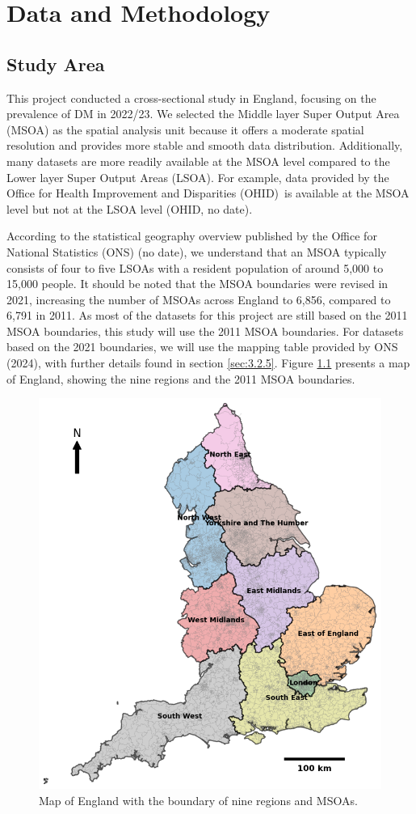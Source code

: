 \chapter{Data and Methodology}
\label{chap:3}
\section{Study Area}
\label{sec:3.1}
This project conducted a cross-sectional study in England, focusing on the prevalence of DM in 2022/23. We selected the Middle layer Super Output Area (MSOA) as the spatial analysis unit because it offers a moderate spatial resolution and provides more stable and smooth data distribution. Additionally, many datasets are more readily available at the MSOA level compared to the Lower layer Super Output Areas (LSOA). For example, data provided by the Office for Health Improvement and Disparities (OHID) is available at the MSOA level but not at the LSOA level (OHID, no date).

According to the statistical geography overview published by the Office for National Statistics (ONS) (no date), we understand that an MSOA typically consists of four to five LSOAs with a resident population of around 5,000 to 15,000 people. It should be noted that the MSOA boundaries were revised in 2021, increasing the number of MSOAs across England to 6,856, compared to 6,791 in 2011. As most of the datasets for this project are still based on the 2011 MSOA boundaries, this study will use the 2011 MSOA boundaries. For datasets based on the 2021 boundaries, we will use the mapping table provided by ONS (2024), with further details found in section \ref{sec:3.2.5}. Figure \ref{fig:A3.1} presents a map of England, showing the nine regions and the 2011 MSOA boundaries.

\begin{figure}[ht]
  \centering
  \includegraphics[width=.65\linewidth]{ucl-latex-thesis-templates-master/Image/datageo_area_1.png}
  \caption{Map of England with the boundary of nine regions and MSOAs.}
  \label{fig:A3.1}
\end{figure}%


